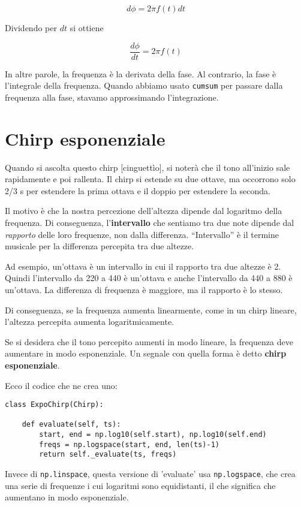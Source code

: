 \documentclass[12pt,a4paper]{book}
\begin{document}
%
\[ d\phi = 2 \pi f(t) dt \] 

%
Dividendo per $dt$ si ottiene

%
\[ \frac{d\phi}{dt} = 2 \pi f(t) \] 

%
In altre parole, la frequenza è la derivata della fase. Al contrario, la fase è l'integrale della frequenza. Quando abbiamo usato {\tt cumsum} per passare dalla frequenza alla fase, stavamo approssimando l'integrazione.

\section{Chirp esponenziale} 

Quando si ascolta questo chirp [cinguettìo], si noterà che il tono all'inizio sale rapidamente e poi rallenta. Il chirp si estende su due ottave, ma occorrono solo 2/3 s per estendere la prima ottava e il doppio per estendere la seconda.

Il motivo è che la nostra percezione dell'altezza dipende dal logaritmo della frequenza. Di conseguenza, l'{\bf intervallo} che sentiamo tra due note dipende dal {\em rapporto} delle loro frequenze, non dalla differenza. ``Intervallo'' è il termine musicale per la differenza percepita tra due altezze.

Ad esempio, un'ottava è un intervallo in cui il rapporto tra due altezze è 2. Quindi l'intervallo da 220 a 440 è un'ottava e anche l'intervallo da 440 a 880 è un'ottava. La differenza di frequenza è maggiore, ma il rapporto è lo stesso.

Di conseguenza, se la frequenza aumenta linearmente, come in un chirp lineare, l'altezza percepita aumenta logaritmicamente.

Se si desidera che il tono percepito aumenti in modo lineare, la frequenza deve aumentare in modo esponenziale. Un segnale con quella forma è detto {\bf chirp esponenziale}.

Ecco il codice che ne crea uno:

\begin{verbatim} 
class ExpoChirp(Chirp):

    def evaluate(self, ts):
        start, end = np.log10(self.start), np.log10(self.end)
        freqs = np.logspace(start, end, len(ts)-1)
        return self._evaluate(ts, freqs)
 \end{verbatim} 

Invece di {\tt np.linspace}, questa versione di 'evaluate' usa {\tt np.logspace}, che crea una serie di frequenze i cui logaritmi sono equidistanti, il che significa che aumentano in modo esponenziale.
\end{document}
